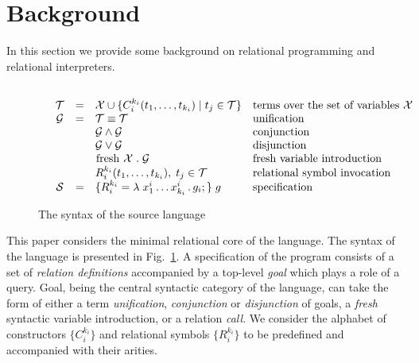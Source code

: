 \section{Background}

In this section we provide some background on relational programming and relational interpreters.

\subsection{\mk}

\begin{figure*}[t]
  \[
  \begin{array}{cccll}
    &\mathcal{T} & = & \mathcal{X} \cup \{C_i^{k_i} (t_1, \dots, t_{k_i}) \mid t_j\in\mathcal{T}\} & \mbox{terms over the set of variables $\mathcal{X}$} \\
    &\mathcal{G} & = & \mathcal{T}\equiv\mathcal{T}   &  \mbox{unification} \\
    &            &   & \mathcal{G}\wedge\mathcal{G}     & \mbox{conjunction} \\
    &            &   & \mathcal{G}\vee\mathcal{G}       &\mbox{disjunction} \\
    &            &   & \mbox{\lstinline|fresh|}\;\mathcal{X}\;.\;\mathcal{G} & \mbox{fresh variable introduction} \\
    &            &   & R_i^{k_i} (t_1,\dots,t_{k_i}),\;t_j\in\mathcal{T} & \mbox{relational symbol invocation} \\
    &\mathcal{S} & = & \{R_i^{k_i} = \lambda\;x_1^i\dots x_{k_i}^i\,.\, g_i;\}\; g & \mbox{specification}
  \end{array}
  \]
  \caption{The syntax of the source language}
  \label{syntax}
  \end{figure*}



This paper considers the minimal relational core of the \mk language.
The syntax of the language is presented in Fig.~\ref{syntax}.
A specification of the \mk program consists of a set of \emph{relation definitions} accompanied by a top-level \emph{goal} which plays a role of a query.
Goal, being the central syntactic category of the language, can take the form of either a term \emph{unification}, \emph{conjunction} or \emph{disjunction} of goals, a \emph{fresh} syntactic variable introduction, or a relation \emph{call}.
We consider the alphabet of constructors $\{C^{k_i}_i\}$ and relational symbols $\{R^{k_i}_i\}$ to be predefined and accompanied with their arities.

